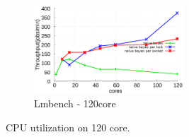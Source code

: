 \begin{figure}[tb]
\begin{subfigure}[b]{0.33\textwidth}
    \end{subfigure}%
        \begin{subfigure}[b]{0.33\textwidth}
        \includegraphics[width=2.2in]{graph/nb_docker.eps}
        \caption{Lmbench - 120core}
    \end{subfigure}%
        \centering
    \caption{CPU utilization on 120 core.}
    \label{fig:utilization3}
\end{figure}





